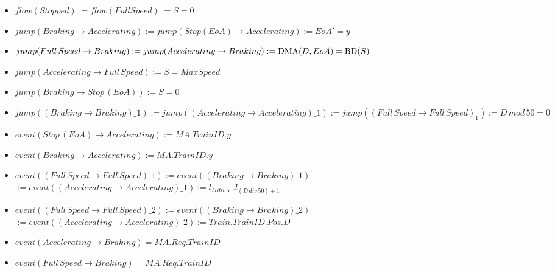 \begin{mydef}
\begin{description}
\begin{itemize}
	\item $flow(Stopped) := flow(Full Speed) := \dot{S} = 0$
 
	\end{itemize}

\item[Jump Conditions] \hspace*{0mm}

	\begin{itemize}


	\item  $jump(Braking \to Accelerating) := jump(Stop (EoA) \to Accelerating) :=  EoA' = y$ 
	

	\item $jump(Full \, Speed \to Braking) := jump(Accelerating \to Braking) := \mathrm{DMA}(D,EoA) = \mathrm{BD}(S)$


	\item $jump(Accelerating \to Full \, Speed) := S = MaxSpeed$
	
	\item $jump(Braking \to Stop \, (EoA)) := S = 0$

	\item $jump((Braking \to Braking)\_1) := jump((Accelerating \to Accelerating)\_1) := jump((Full \, Speed \to Full \, Speed)_1) := D \, mod \, 50 = 0$
	\end{itemize}

\item[Events] \hspace*{0mm}
\begin{itemize}
	\item $event (Stop \, (EoA) \to Accelerating) := MA.TrainID.y$
	\item $event (Braking \to Accelerating) := MA.TrainID.y$
	\item $event((Full \, Speed \to Full \, Speed)\_1) := event((Braking \to Braking)\_1)$ \\
                  $:= event((Accelerating \to Accelerating)\_1)  := l_{D \, div \, 50}.l_{(D \, div \, 50) +1}$
\item $event((Full \, Speed \to Full \, Speed)\_2) := event((Braking \to Braking)\_2)$  \\
        $:= event((Accelerating \to Accelerating)\_2) := Train.TrainID.Pos.D$
	\item $event(Accelerating \to Braking) = MA.Req.TrainID$
	\item $event(Full \, Speed \to Braking) = MA.Req.TrainID$
\end{itemize}

\end{description}
\end{mydef}
